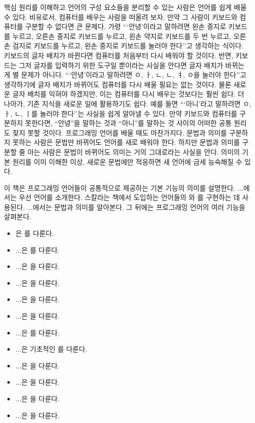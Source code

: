 핵심 원리를 이해하고 언어의 구성 요소들을 분리할 수 있는 사람은 언어를 쉽게 배울
수 있다. 비유로서, 컴퓨터를 배우는 사람을 떠올려 보자. 만약 그 사람이 키보드와
컴퓨터를 구분할 수 없다면 큰 문제다. 가령 ```안녕'이라고 말하려면 왼손 중지로
키보드를 누르고, 오른손 중지로 키보드를 누르고, 왼손 약지로 키보드를 두 번
누르고, 오른손 검지로 키보드를 누르고, 왼손 중지로 키보드를 눌러야 한다''고
생각하는 식이다. 키보드의 글자 배치가 바뀐다면 컴퓨터를 처음부터 다시 배워야 할
것이다. 반면, 키보드는 그저 글자를 입력하기 위한 도구일 뿐이라는 사실을 안다면
글자 배치가 바뀌는 게 별 문제가 아니다. ```안녕'이라고 말하려면 ㅇ, ㅏ, ㄴ, ㄴ,
ㅕ, ㅇ을 눌러야 한다''고 생각하기에 글자 배치가 바뀌어도 컴퓨터를 다시 배울
필요는 없는 것이다. 물론 새로운 글자 배치를 익혀야 하겠지만, 이는 컴퓨터를 다시
배우는 것보다는 훨씬 쉽다. 더 나아가, 기존 지식을 새로운 일에 활용하기도 쉽다.
예를 들면 ```아니'라고 말하려면 ㅇ, ㅏ, ㄴ, ㅣ를 눌러야 한다''는 사실을 쉽게
알아낼 수 있다. 만약 키보드와 컴퓨터를 구분하지 못한다면, ``안녕''을 말하는 것과
``아니''를 말하는 것 사이의 어떠한 공통 원리도 찾지 못할 것이다. 프로그래밍 언어를
배울 때도 마찬가지다. 문법과 의미를 구분하지 못하는 사람은 문법만 바뀌어도
언어를 새로 배워야 한다. 하지만 문법과 의미를 구분할 줄 아는 사람은 문법이
바뀌어도 의미는 거의 그대로라는 사실을 안다. 의미의 기본 원리를 이미 이해한
이상, 새로운 문법에만 적응하면 새 언어에 금세 능숙해질 수 있다.

이 책은 프로그래밍 언어들이 공통적으로 제공하는 기본 기능의 의미를 설명한다.
...에서는 우선  언어를 소개한다. 스칼라는 책에서 도입하는 언어들의
와 를 구현하는 데 사용된다.
...에서는 문법과 의미를 알아본다. 그 뒤에는 프로그래밍 언어의 여러 기능을
살펴본다.

\begin{itemize}
\item {}은 를 다룬다.
\item ...은 를 다룬다.
\item ...은 을 다룬다.
\item ...은 을 다룬다.
\item ...은 을 다룬다.
\item ...은 을 다룬다.
\item ...은 를 다룬다.
\item ...은 기초적인 를 다룬다.
\item ...은 을 다룬다.
\item ...은 을 다룬다.
\item ...은 을 다룬다.
\item ...은 을 다룬다.
\end{itemize}


